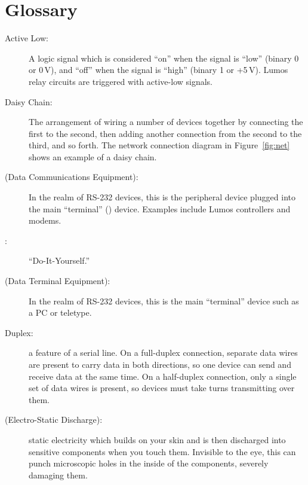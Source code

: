 \documentclass[letterpaper,twoside,onecolumn,openright,final]{memoir}
\begin{document}
\chapter{Glossary}\label{ch:glossary}
\begin{description}
	\item[Active Low:]
		A logic signal which is considered ``on'' when the signal is ``low'' (binary 0 or 0\,V),
		and ``off'' when the signal is ``high'' (binary 1 or +5\,V).  Lumos relay circuits are 
		triggered with active-low signals.
	\item[Daisy Chain:]
		The arrangement of wiring a number of devices together by connecting the first to the second,
		then adding another connection from the second to the third, and so forth.  The network
		connection diagram in Figure~\ref{fig:net} shows an example of a daisy chain.
	\item[ (Data Communications Equipment):]  In the realm of RS-232 devices, this is the peripheral
		device plugged into the main ``terminal'' () device.  Examples include
		Lumos controllers and modems.
	\item[:] ``Do-It-Yourself.''
	\item[ (Data Terminal Equipment):]  In the realm of RS-232 devices, this is the
		main ``terminal'' device such as a PC or teletype.
	\item[Duplex:]
		a feature of a serial line.  On a full-duplex connection, separate data wires are present
		to carry data in both directions, so one device can send and receive data at the same time.
		On a half-duplex connection, only a single set of data wires is present, so devices must
		take turns transmitting over them.
	\item[ (Electro-Static Discharge):]
		static electricity which builds on your skin and is then discharged into sensitive
		components when you touch them.  Invisible to the eye, this can punch microscopic holes
		in the inside of the components, severely damaging them.

\end{description}
\end{document}
